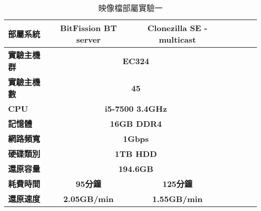 \begin{table}[htbp]
\centering
\caption{映像檔部屬實驗一}
\label{pcspec}
\begin{adjustbox}{max width=0.92\textwidth}
\begin{tabular}{lcccccc}

\toprule
\multicolumn{1}{l}{\textbf{部屬系統}} & \textbf{BitFission BT server} & \textbf{Clonezilla SE - multicast} \\ \midrule
\multicolumn{1}{l}{\textbf{實驗主機群}} & \multicolumn{2}{c}{\textbf{EC324}} \\
\multicolumn{1}{l}{\textbf{實驗主機數}} & \multicolumn{2}{c}{\textbf{45}} \\
\multicolumn{1}{l}{\textbf{CPU}} & \multicolumn{2}{c}{\textbf{i5-7500 3.4GHz}} \\
\multicolumn{1}{l}{\textbf{記憶體}} & \multicolumn{2}{c}{\textbf{16GB DDR4}} \\
\multicolumn{1}{l}{\textbf{網路頻寬}} & \multicolumn{2}{c}{\textbf{1Gbps}} \\
\multicolumn{1}{l}{\textbf{硬碟類別}} & \multicolumn{2}{c}{\textbf{1TB HDD}} \\
\multicolumn{1}{l}{\textbf{還原容量}} & \multicolumn{2}{c}{\textbf{194.6GB}} \\
\multicolumn{1}{l}{\textbf{耗費時間}} & \textbf{95分鐘} & \textbf{125分鐘} \\
\multicolumn{1}{l}{\textbf{還原速度}} & \textbf{2.05GB/min} & \textbf{1.55GB/min} \\

\bottomrule
\end{tabular}
\end{adjustbox}
\end{table}
